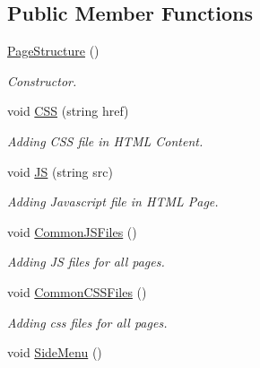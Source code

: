 \subsection*{Public Member Functions}
\begin{DoxyCompactItemize}
\item 
\hypertarget{classPageStructure_ae81b9e4e304ec2ec600b9a76bcb43271}{\hyperlink{classPageStructure_ae81b9e4e304ec2ec600b9a76bcb43271}{Page\-Structure} ()}\label{classPageStructure_ae81b9e4e304ec2ec600b9a76bcb43271}

\begin{DoxyCompactList}\small\item\em Constructor. \end{DoxyCompactList}\item 
void \hyperlink{classPageStructure_a109d21d10a5a95494ee078fc30fe13f2}{C\-S\-S} (string href)
\begin{DoxyCompactList}\small\item\em Adding C\-S\-S file in H\-T\-M\-L Content. \end{DoxyCompactList}\item 
void \hyperlink{classPageStructure_ae9f524db12d813e052d8b24834aa4c5b}{J\-S} (string src)
\begin{DoxyCompactList}\small\item\em Adding Javascript file in H\-T\-M\-L Page. \end{DoxyCompactList}\item 
\hypertarget{classPageStructure_a4ad1c0bdd9aa5b8d3d972bef7ba9c280}{void \hyperlink{classPageStructure_a4ad1c0bdd9aa5b8d3d972bef7ba9c280}{Common\-J\-S\-Files} ()}\label{classPageStructure_a4ad1c0bdd9aa5b8d3d972bef7ba9c280}

\begin{DoxyCompactList}\small\item\em Adding J\-S files for all pages. \end{DoxyCompactList}\item 
\hypertarget{classPageStructure_aea0a385d963928fea183c01d5cdfe5ab}{void \hyperlink{classPageStructure_aea0a385d963928fea183c01d5cdfe5ab}{Common\-C\-S\-S\-Files} ()}\label{classPageStructure_aea0a385d963928fea183c01d5cdfe5ab}

\begin{DoxyCompactList}\small\item\em Adding css files for all pages. \end{DoxyCompactList}\item 
\hypertarget{classPageStructure_aa6f5cea2a7c9f56e776a89bae7de4887}{void \hyperlink{classPageStructure_aa6f5cea2a7c9f56e776a89bae7de4887}{Side\-Menu} ()}\label{classPageStructure_aa6f5cea2a7c9f56e776a89bae7de4887}


\end{DoxyCompactItemize}
